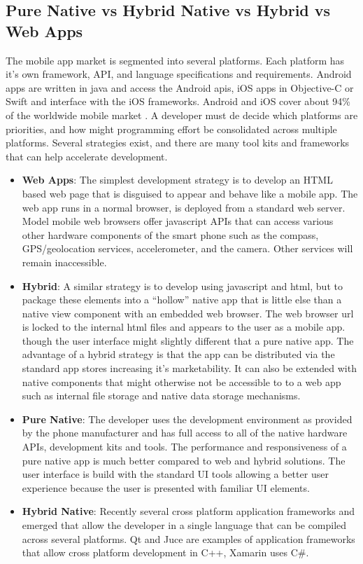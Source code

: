 \subsection{Pure Native vs Hybrid Native vs Hybrid vs Web Apps}

The mobile app market is segmented into several platforms. Each platform has it’s own framework, API, and language specifications and requirements. Android apps are written in java and access the Android apis, iOS apps in Objective-C or Swift and interface with the iOS frameworks. Android and iOS cover about 94\% of the worldwide mobile market \cite{mobile_market}. A developer must de decide which platforms are priorities, and how might programming effort be consolidated across multiple platforms. Several strategies exist, and there are many tool kits and frameworks that can help accelerate development.

\begin{itemize}[label={}]

\item \textbf{Web Apps}: The simplest development strategy is to develop an HTML based web page that is disguised to appear and behave like a mobile app. The web app runs in a normal browser, is deployed from a standard web server. Model mobile web browsers offer javascript APIs that can access various other hardware components of the smart phone such as the compass, GPS/geolocation services, accelerometer, and the camera. Other services will remain inaccessible.

\item \textbf{Hybrid}: A similar strategy is to develop using javascript and html, but to package these elements into a “hollow” native app that is little else than a native view component with an embedded web browser. The web browser url is locked to the internal html files and appears to the user as a mobile app. though the user interface might slightly different that a pure native app. The advantage of a hybrid strategy is that the app can be distributed via the standard app stores increasing it’s marketability. It can also be extended with native components that might otherwise not be accessible to to a web app such as internal file storage and native data storage mechanisms.

\item \textbf{Pure Native}: The developer uses the development environment as provided by the phone manufacturer and has full access to all of the native hardware APIs, development kits and tools. The performance and responsiveness of a pure native app is much better compared to web and hybrid solutions. The user interface is build with the standard UI tools allowing a better user experience because the user is presented with familiar UI elements.

\item \textbf{Hybrid Native}: Recently several cross platform application frameworks and emerged that allow the developer in a single language that can be compiled across several platforms. Qt and Juce are examples of application frameworks that allow cross platform development in C++, Xamarin uses C\#.

\end{itemize}


